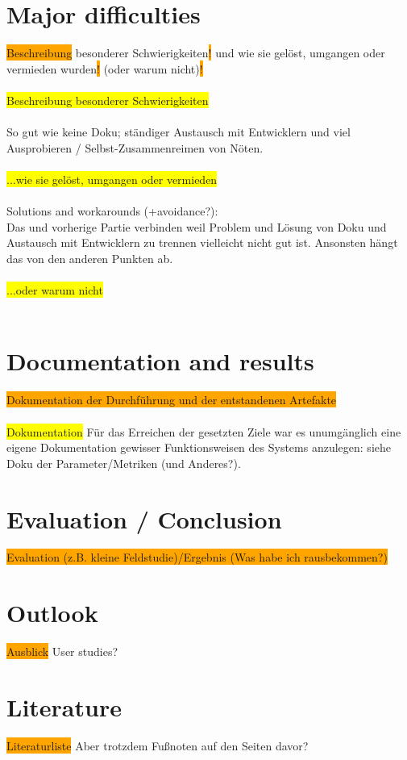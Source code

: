 \documentclass[12pt,a4paper]{article}
\begin{document}
\section{Major difficulties}
\colorbox{orange}{Beschreibung} besonderer Schwierigkeiten\colorbox{orange}{!} und wie sie gelöst, umgangen oder vermieden wurden\colorbox{orange}{!} (oder warum nicht)\colorbox{orange}{!}
\\
\\
\colorbox{yellow}{Beschreibung besonderer Schwierigkeiten}
\\
\\
So gut wie keine Doku; ständiger Austausch mit Entwicklern und viel Ausprobieren / Selbst-Zusammenreimen von Nöten.
\\
\\
\colorbox{yellow}{...wie sie gelöst, umgangen oder vermieden}
\\
\\
Solutions and workarounds (+avoidance?):\\
Das und vorherige Partie verbinden weil Problem und Lösung von Doku und Austausch mit Entwicklern zu trennen vielleicht nicht gut ist. Ansonsten hängt das von den anderen Punkten ab.
\\
\\
\colorbox{yellow}{...oder warum nicht}
\\
\\
%
%
%
\section{Documentation and results}
\colorbox{orange}{Dokumentation der Durchführung und der entstandenen Artefakte}
\\
\\
\colorbox{yellow}{Dokumentation}
Für das Erreichen der gesetzten Ziele war es unumgänglich eine eigene Dokumentation gewisser Funktionsweisen des Systems anzulegen: siehe Doku der Parameter/Metriken (und Anderes?).
%
%
%
\section{Evaluation / Conclusion}
\colorbox{orange}{Evaluation (z.B. kleine Feldstudie)/Ergebnis (Was habe ich rausbekommen?)}
%
%
%
\section{Outlook}
\colorbox{orange}{Ausblick}
User studies?
%
%
%
\section{Literature}
\colorbox{orange}{Literaturliste}
Aber trotzdem Fußnoten auf den Seiten davor?
%
%
%
\end{document}
